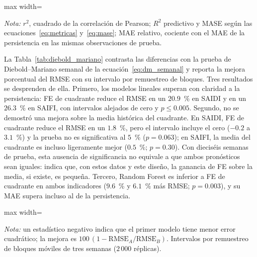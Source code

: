 \begin{table}[!htbp]
\centering
\small
\caption{Desempeño en el conjunto de prueba para SAIFI (escala $\log(1+y)$; muestra común, $N=2\,212$)}
\label{tab:desempeno_saifi}
\begin{adjustbox}{max width=\linewidth}

\end{adjustbox}

\vspace{2pt}
\noindent\footnotesize\textit{Nota:} $r^2$, cuadrado de la correlación de Pearson; $R^2$ predictivo y MASE según las ecuaciones~\eqref{eq:metricas} y~\eqref{eq:mase}; MAE relativo, cociente con el MAE de la persistencia en las mismas observaciones de prueba.
\end{table}

La Tabla~\ref{tab:diebold_mariano} contrasta las diferencias con la prueba de Diebold--Mariano semanal de la ecuación~\eqref{eq:dm_semanal} y reporta la mejora porcentual del RMSE con su intervalo por remuestreo de bloques. Tres resultados se desprenden de ella. Primero, los modelos lineales superan con claridad a la persistencia: FE de cuadrante reduce el RMSE en un $20{.}9$~\% en SAIDI y en un $26{.}3$~\% en SAIFI, con intervalos alejados de cero y $p\leq0{.}005$. Segundo, no se demostró una mejora sobre la media histórica del cuadrante. En SAIDI, FE de cuadrante reduce el RMSE en un $1{.}8$~\%, pero el intervalo incluye el cero ($-0{.}2$ a $3{.}1$~\%) y la prueba no es significativa al $5$~\% ($p=0{.}063$); en SAIFI, la media del cuadrante es incluso ligeramente mejor ($0{.}5$~\%; $p=0{.}30$). Con dieciséis semanas de prueba, esta ausencia de significancia no equivale a que ambos pronósticos sean iguales: indica que, con estos datos y este diseño, la ganancia de FE sobre la media, si existe, es pequeña. Tercero, Random Forest es inferior a FE de cuadrante en ambos indicadores ($9{.}6$~\% y $6{.}1$~\% más RMSE; $p=0{.}003$), y su MAE supera incluso al de la persistencia.

\begin{table}[!htbp]
\centering
\small
\caption{Diebold--Mariano semanal y mejora del RMSE con intervalo por remuestreo de bloques de semanas ($T=16$)}
\label{tab:diebold_mariano}
\begin{adjustbox}{max width=\linewidth}

\end{adjustbox}

\vspace{2pt}
\noindent\footnotesize\textit{Nota:} un estadístico negativo indica que el primer modelo tiene menor error cuadrático; la mejora es $100\,(1-\mathrm{RMSE}_A/\mathrm{RMSE}_B)$. Intervalos por remuestreo de bloques móviles de tres semanas ($2\,000$ réplicas).
\end{table}

